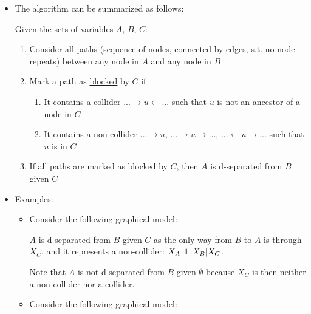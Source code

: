 \begin{itemize}
	\item The algorithm can be summarized as follows:
	\begin{tcolorbox}[colback=white!85!gray,colframe=gray!75!black,title=D-separation]
		Given the sets of variables $A$, $B$, $C$:
		\begin{enumerate}
			\item Consider all paths (sequence of nodes, connected by edges,  s.t. no node repeats) between any node in $A$ and any node in $B$
			\item Mark a path as \underline{blocked} by $C$ if
			\begin{enumerate}
				\item It contains a collider $...\rightarrow u \leftarrow ...$ such that $u$ is not an ancestor of a node in $C$
				\item It contains a non-collider $...\rightarrow u$, $...\rightarrow u \rightarrow ...$, $...\leftarrow u \rightarrow ...$ such that $u$ is in $C$
			\end{enumerate}
			\item If all paths are marked as blocked by $C$, then $A$ is d-separated from $B$ given $C$
		\end{enumerate}
	\end{tcolorbox}	
	\item \underline{Examples}: 
	\begin{itemize}
		\item Consider the following graphical model:
		\begin{figure}[ht!]
			\centering
		\end{figure}
	
		$A$ is d-separated from $B$ given $C$ as the only way from $B$ to $A$ is through $X_C$, and it represents a non-collider: $X_A\independent X_B|X_C$.
		
		Note that $A$ is not d-separated from $B$ given $\emptyset$ because $X_C$ is then neither a non-collider nor a collider.
		\item Consider the following graphical model:
		\begin{figure}[ht!]
			\centering
		\end{figure}
	

\end{itemize}
\end{itemize}
